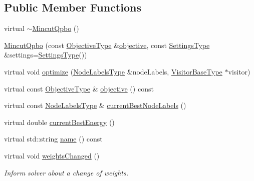 \subsection*{Public Member Functions}
\begin{DoxyCompactItemize}
\item 
virtual \hyperlink{classnifty_1_1graph_1_1opt_1_1mincut_1_1MincutQpbo_a668a60d0a8e392aed0165b5ca9ab92a8}{$\sim$\+Mincut\+Qpbo} ()
\item 
\hyperlink{classnifty_1_1graph_1_1opt_1_1mincut_1_1MincutQpbo_a0abee9db61e9ef5acf4c1a5e2cc51515}{Mincut\+Qpbo} (const \hyperlink{classnifty_1_1graph_1_1opt_1_1mincut_1_1MincutQpbo_ac598cbbe660ac111ee5af88095d4b6e7}{Objective\+Type} \&\hyperlink{classnifty_1_1graph_1_1opt_1_1mincut_1_1MincutQpbo_af607a7941ed3d4976129bf81bfbf5f8f}{objective}, const \hyperlink{structnifty_1_1graph_1_1opt_1_1mincut_1_1MincutQpbo_1_1SettingsType}{Settings\+Type} \&settings=\hyperlink{structnifty_1_1graph_1_1opt_1_1mincut_1_1MincutQpbo_1_1SettingsType}{Settings\+Type}())
\item 
virtual void \hyperlink{classnifty_1_1graph_1_1opt_1_1mincut_1_1MincutQpbo_a04f877bddd6095ec3f9db4f21db14274}{optimize} (\hyperlink{classnifty_1_1graph_1_1opt_1_1mincut_1_1MincutQpbo_ac4034e26807b6dd2ec740c8716f89ad8}{Node\+Labels\+Type} \&node\+Labels, \hyperlink{classnifty_1_1graph_1_1opt_1_1mincut_1_1MincutQpbo_a1233aed5d95f3549018cabfb2f5c51c3}{Visitor\+Base\+Type} $\ast$visitor)
\item 
virtual const \hyperlink{classnifty_1_1graph_1_1opt_1_1mincut_1_1MincutQpbo_ac598cbbe660ac111ee5af88095d4b6e7}{Objective\+Type} \& \hyperlink{classnifty_1_1graph_1_1opt_1_1mincut_1_1MincutQpbo_af607a7941ed3d4976129bf81bfbf5f8f}{objective} () const
\item 
virtual const \hyperlink{classnifty_1_1graph_1_1opt_1_1mincut_1_1MincutQpbo_ac4034e26807b6dd2ec740c8716f89ad8}{Node\+Labels\+Type} \& \hyperlink{classnifty_1_1graph_1_1opt_1_1mincut_1_1MincutQpbo_a8cec66d517bc70ed0065b60174d01ce4}{current\+Best\+Node\+Labels} ()
\item 
virtual double \hyperlink{classnifty_1_1graph_1_1opt_1_1mincut_1_1MincutQpbo_a5ec74bde057ce6892451d3c08042945e}{current\+Best\+Energy} ()
\item 
virtual std\+::string \hyperlink{classnifty_1_1graph_1_1opt_1_1mincut_1_1MincutQpbo_a4bcea4c5573610d9b656a06772d97353}{name} () const
\item 
virtual void \hyperlink{classnifty_1_1graph_1_1opt_1_1mincut_1_1MincutQpbo_acab46ec306e4b604eff21549a4366d39}{weights\+Changed} ()
\begin{DoxyCompactList}\small\item\em Inform solver about a change of weights. \end{DoxyCompactList}\end{DoxyCompactItemize}


